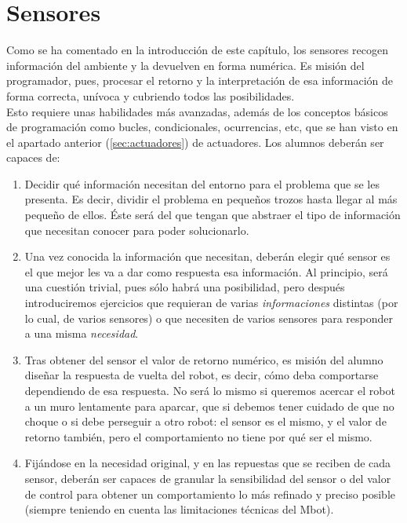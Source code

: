 \section{Sensores}
Como se ha comentado en la introducción de este capítulo, los sensores recogen información del ambiente y la devuelven en forma numérica. Es misión del programador, pues, procesar el retorno y la interpretación de esa información de forma correcta, unívoca y cubriendo todos las posibilidades. \\
Esto requiere unas habilidades más avanzadas, además de los conceptos básicos de programación como bucles, condicionales, ocurrencias, etc, que se han visto en el apartado anterior (\ref{sec:actuadores}) de actuadores. Los alumnos deberán ser capaces de: 
\begin{enumerate}
	\item Decidir qué información necesitan del entorno para el problema que se les presenta. Es decir, dividir el problema en pequeños trozos hasta llegar al más pequeño de ellos. Éste será del que tengan que abstraer el tipo de información que necesitan conocer para poder solucionarlo.
	\item Una vez conocida la información que necesitan, deberán elegir qué sensor es el que mejor les va a dar como respuesta esa información. Al principio, será una cuestión trivial, pues sólo habrá una posibilidad, pero después introduciremos ejercicios que requieran de varias \textit{informaciones} distintas (por lo cual, de varios sensores) o que necesiten de varios sensores para responder a una misma \textit{necesidad}.
	\item Tras obtener del sensor el valor de retorno numérico, es misión del alumno diseñar la respuesta de vuelta del robot, es decir, cómo deba comportarse dependiendo de esa respuesta. No será lo mismo si queremos acercar el robot a un muro lentamente para aparcar, que si debemos tener cuidado de que no choque o si debe perseguir a otro robot: el sensor es el mismo, y el valor de retorno también, pero el comportamiento no tiene por qué ser el mismo. 	
	\item Fijándose en la necesidad original, y en las repuestas que se reciben de cada sensor, deberán ser capaces de granular la sensibilidad del sensor o del valor de control para obtener un comportamiento lo más refinado y preciso posible (siempre teniendo en cuenta las limitaciones técnicas del Mbot).
\end{enumerate}

